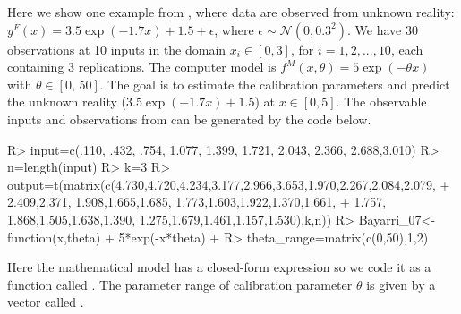  Here we show one example from \cite{bayarri2007framework}, where data are observed from unknown reality:  $y^F(x)=3.5\exp(-1.7x)+1.5+\epsilon$, where $\epsilon \sim \mathcal N(0,0.3^2)$. We have 30 observations at 10 inputs in the domain $x_i \in [0,3]$, for $i=1,2,...,10$, each containing $3$ replications. The 
computer model is $f^M(x,\theta)= 5 \exp(-\theta x)$ with $\theta \in [0,\, 50]$.  The goal is to estimate the calibration parameters and predict the unknown reality ($3.5\exp(-1.7x)+1.5$) at $x\in [0,5]$. 
The observable inputs and observations from  \cite{bayarri2007framework} can be generated by the code below. 
\begin{example}
R> input=c(.110, .432, .754, 1.077, 1.399, 1.721, 2.043, 2.366, 2.688,3.010)
R> n=length(input)
R> k=3
R> output=t(matrix(c(4.730,4.720,4.234,3.177,2.966,3.653,1.970,2.267,2.084,2.079,
+                2.409,2.371,  1.908,1.665,1.685, 1.773,1.603,1.922,1.370,1.661,
+                1.757, 1.868,1.505,1.638,1.390, 1.275,1.679,1.461,1.157,1.530),k,n))
R> Bayarri_07<-function(x,theta){
+   5*exp(-x*theta) 
+ }
R> theta_range=matrix(c(0,50),1,2) 
\end{example}
Here the mathematical model has a closed-form expression so we code it as a function called . The parameter range of calibration parameter $\theta$ is given by a vector called . 


